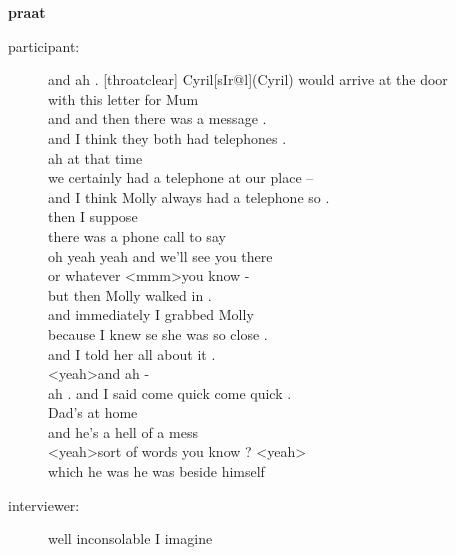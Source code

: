 \documentclass{article}
\newcommand{\turn}[2]{
\item[#1:] #2
}
\begin{document}
\begin{center}\textbf{praat}\end{center}

\begin{description}

\turn{participant}{and ah . [throatclear] Cyril[sIr@l](Cyril) would arrive at the door\\
with this letter for Mum\\
and and then there was a message .\\
and I think they both had telephones .\\
ah at that time\\
we certainly had a telephone at our place --\\
and I think Molly always had a telephone so .\\
then I suppose\\
there was a phone call to say\\
oh yeah yeah and we'll see you there\\
or whatever \textless mmm\textgreater  you know -\\
but then Molly walked in .\\
and immediately I grabbed Molly\\
because I knew se she was so close .\\
and I told her all about it .\\
\textless yeah\textgreater  and ah -\\
ah . and I said come quick come quick .\\
Dad's at home\\
and he's a hell of a mess\\
\textless yeah\textgreater  sort of words you know ? \textless yeah\textgreater \\
which he was he was beside himself}

\turn{interviewer}{well inconsolable I imagine}


\end{description}
\end{document}
